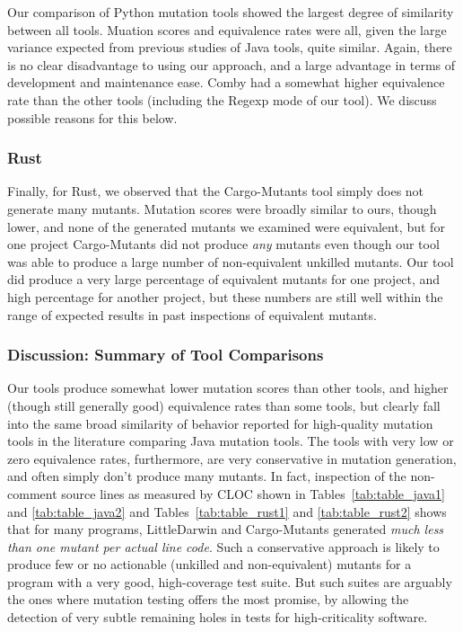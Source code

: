 \documentclass[sigconf,review, anonymous]{acmart}
\begin{document}
{Our comparison of Python mutation tools showed the largest degree of
similarity between all tools.  Muation scores and equivalence rates
were all, given the large variance expected from previous studies of
Java tools, quite similar.  Again, there is no clear disadvantage to
using our approach, and a large advantage in terms of development and
maintenance ease.  Comby had a somewhat higher equivalence rate than the
other tools (including the Regexp mode of our tool).  We discuss
possible reasons for this below.

\subsubsection{Rust}

Finally, for Rust, we observed that the Cargo-Mutants tool simply does
not generate many mutants.  Mutation scores were broadly similar to
ours, though lower, and none of the generated mutants we examined were
equivalent, but for one project Cargo-Mutants did not produce
\emph{any} mutants even though our tool was able to produce a large
number of non-equivalent unkilled mutants.  Our tool did produce a
very large percentage of equivalent mutants for one project, and high
percentage for another project, but these numbers are still well
within the range of expected results in past inspections of
equivalent mutants.

\subsubsection{Discussion: Summary of Tool Comparisons}

Our tools produce somewhat lower mutation scores than other tools, and
higher (though still generally good) equivalence rates than some
tools, but clearly fall into the same broad similarity of behavior
reported for high-quality mutation tools in the literature comparing
Java mutation tools.   The tools with very low or zero equivalence rates, furthermore,
are very conservative in mutation generation, and often simply don't
produce many mutants.  In fact, inspection of the non-comment source
lines as measured by CLOC shown in Tables~\ref{tab:table_java1} and
\ref{tab:table_java2} and Tables~\ref{tab:table_rust1} and
\ref{tab:table_rust2} shows that for many programs, LittleDarwin and
Cargo-Mutants generated \emph{much less than one mutant per actual
  line code}.  Such a conservative approach is likely to produce few
or no actionable (unkilled and non-equivalent) mutants for a program
with a very good, high-coverage test suite.  But such suites are
arguably the ones where mutation testing offers the most promise, by
allowing the detection of very subtle remaining holes in tests for
high-criticality software.

}
\end{document}
